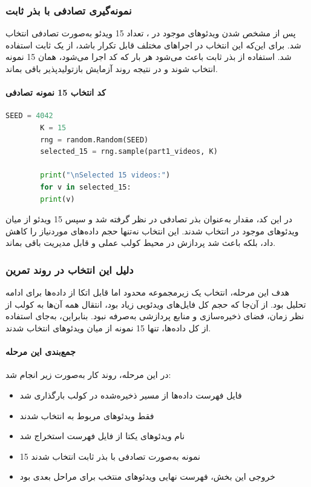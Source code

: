 \documentclass{article}
\begin{document}
\subsubsection{نمونه‌گیری تصادفی با بذر ثابت}

پس از مشخص شدن ویدئوهای موجود در ، تعداد 15 ویدئو به‌صورت تصادفی انتخاب شد. برای این‌که این انتخاب در اجراهای مختلف قابل تکرار باشد، از یک  ثابت استفاده شد. استفاده از بذر ثابت باعث می‌شود هر بار که کد اجرا می‌شود، همان 15 نمونه انتخاب شوند و در نتیجه روند آزمایش بازتولیدپذیر باقی بماند.

\paragraph{کد انتخاب 15 نمونه تصادفی}


\begin{latin}
	\begin{lstlisting}[language=Python, basicstyle=\ttfamily\scriptsize]
		SEED = 4042
		K = 15
		rng = random.Random(SEED)
		selected_15 = rng.sample(part1_videos, K)
		
		print("\nSelected 15 videos:")
		for v in selected_15:
		print(v)
	\end{lstlisting}
\end{latin}

در این کد، مقدار  به‌عنوان بذر تصادفی در نظر گرفته شد و سپس 15 ویدئو از میان ویدئوهای موجود در  انتخاب شدند. این انتخاب نه‌تنها حجم داده‌های موردنیاز را کاهش داد، بلکه باعث شد پردازش در محیط کولب عملی و قابل مدیریت باقی بماند.

\subsubsection{دلیل این انتخاب در روند تمرین}

هدف این مرحله، انتخاب یک زیرمجموعه محدود اما قابل اتکا از داده‌ها برای ادامه تحلیل بود. از آن‌جا که حجم کل فایل‌های ویدئویی زیاد بود، انتقال همه آن‌ها به کولب از نظر زمان، فضای ذخیره‌سازی و منابع پردازشی به‌صرفه نبود. بنابراین، به‌جای استفاده از کل داده‌ها، تنها 15 نمونه از میان ویدئوهای  انتخاب شدند.

\paragraph{جمع‌بندی این مرحله}

در این مرحله، روند کار به‌صورت زیر انجام شد:

\begin{itemize}
	\item فایل فهرست داده‌ها از مسیر ذخیره‌شده در کولب بارگذاری شد
	\item فقط ویدئوهای مربوط به  انتخاب شدند
	\item نام ویدئوهای یکتا از فایل فهرست استخراج شد
	\item 15 نمونه به‌صورت تصادفی با بذر ثابت  انتخاب شدند
	\item خروجی این بخش، فهرست نهایی ویدئوهای منتخب برای مراحل بعدی بود
\end{itemize}
\end{document}
